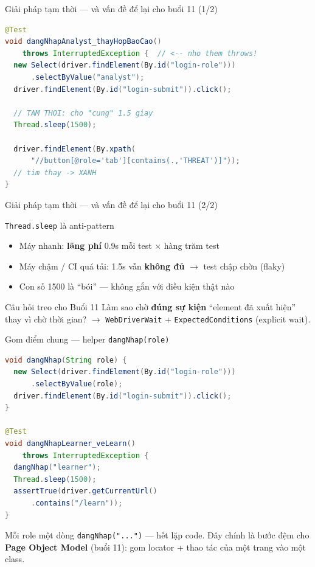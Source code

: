 \documentclass[aspectratio=169,12pt]{beamer}
\begin{document}
\begin{frame}[fragile]{Giải pháp tạm thời --- và vấn đề để lại cho buổi 11 (1/2)}
\begin{lstlisting}[language=java,basicstyle=\ttfamily\scriptsize]
@Test
void dangNhapAnalyst_thayHopBaoCao()
    throws InterruptedException {  // <-- nho them throws!
  new Select(driver.findElement(By.id("login-role")))
      .selectByValue("analyst");
  driver.findElement(By.id("login-submit")).click();

  // TAM THOI: cho "cung" 1.5 giay
  Thread.sleep(1500);

  driver.findElement(By.xpath(
      "//button[@role='tab'][contains(.,'THREAT')]"));
  // tim thay -> XANH
}
\end{lstlisting}
\end{frame}

\begin{frame}{Giải pháp tạm thời --- và vấn đề để lại cho buổi 11 (2/2)}
  \begin{alertblock}{\texttt{Thread.sleep} là anti-pattern}
    \begin{itemize}
      \item Máy nhanh: \textbf{lãng phí} 0.9s mỗi test $\times$ hàng trăm test
      \item Máy chậm / CI quá tải: 1.5s vẫn \textbf{không đủ} $\to$ test chập chờn (flaky)
      \item Con số 1500 là ``bói'' --- không gắn với điều kiện thật nào
    \end{itemize}
  \end{alertblock}

  \begin{exampleblock}{Câu hỏi treo cho Buổi 11}
    Làm sao chờ \textbf{đúng sự kiện} ``element đã xuất hiện'' thay vì chờ
    thời gian?
    $\to$ \texttt{WebDriverWait} + \texttt{ExpectedConditions} (explicit wait).
  \end{exampleblock}
\end{frame}

\begin{frame}[fragile]{Gom điểm chung --- helper \texttt{dangNhap(role)}}
\begin{lstlisting}[language=java,basicstyle=\ttfamily\scriptsize]
void dangNhap(String role) {
  new Select(driver.findElement(By.id("login-role")))
      .selectByValue(role);
  driver.findElement(By.id("login-submit")).click();
}

@Test
void dangNhapLearner_veLearn()
    throws InterruptedException {
  dangNhap("learner");
  Thread.sleep(1500);
  assertTrue(driver.getCurrentUrl()
      .contains("/learn"));
}
\end{lstlisting}

  {\small Mỗi role một dòng \texttt{dangNhap("...")} --- hết lặp code.
  Đây chính là bước đệm cho \textbf{Page Object Model} (buổi 11): gom
  locator + thao tác của một trang vào một class.}
\end{frame}
\end{document}
